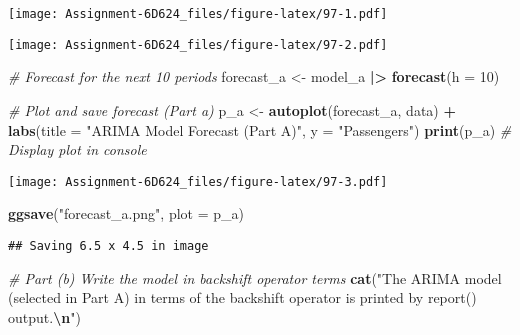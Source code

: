 \documentclass[
]{article}
\newenvironment{Shaded}{\begin{snugshade}}{\end{snugshade}}
\newcommand{\AttributeTok}[1]{\textcolor[rgb]{0.13,0.29,0.53}{#1}}
\newcommand{\CommentTok}[1]{\textcolor[rgb]{0.56,0.35,0.01}{\textit{#1}}}
\newcommand{\DecValTok}[1]{\textcolor[rgb]{0.00,0.00,0.81}{#1}}
\newcommand{\FunctionTok}[1]{\textcolor[rgb]{0.13,0.29,0.53}{\textbf{#1}}}
\newcommand{\NormalTok}[1]{#1}
\newcommand{\OtherTok}[1]{\textcolor[rgb]{0.56,0.35,0.01}{#1}}
\newcommand{\SpecialCharTok}[1]{\textcolor[rgb]{0.81,0.36,0.00}{\textbf{#1}}}
\newcommand{\StringTok}[1]{\textcolor[rgb]{0.31,0.60,0.02}{#1}}
\begin{document}
\texttt{[image: Assignment-6D624\_files/figure-latex/97-1.pdf]}

\begin{Shaded}
\end{Shaded}

\texttt{[image: Assignment-6D624\_files/figure-latex/97-2.pdf]}

\begin{Shaded}
\begin{Highlighting}[]
\CommentTok{\# Forecast for the next 10 periods}
\NormalTok{forecast\_a }\OtherTok{\textless{}{-}}\NormalTok{ model\_a }\SpecialCharTok{|\textgreater{}} \FunctionTok{forecast}\NormalTok{(}\AttributeTok{h =} \DecValTok{10}\NormalTok{)}

\CommentTok{\# Plot and save forecast (Part a)}
\NormalTok{p\_a }\OtherTok{\textless{}{-}} \FunctionTok{autoplot}\NormalTok{(forecast\_a, data) }\SpecialCharTok{+}
  \FunctionTok{labs}\NormalTok{(}\AttributeTok{title =} \StringTok{"ARIMA Model Forecast (Part A)"}\NormalTok{, }\AttributeTok{y =} \StringTok{"Passengers"}\NormalTok{)}
\FunctionTok{print}\NormalTok{(p\_a) }\CommentTok{\# Display plot in console}
\end{Highlighting}
\end{Shaded}

\texttt{[image: Assignment-6D624\_files/figure-latex/97-3.pdf]}

\begin{Shaded}
\begin{Highlighting}[]
\FunctionTok{ggsave}\NormalTok{(}\StringTok{"forecast\_a.png"}\NormalTok{, }\AttributeTok{plot =}\NormalTok{ p\_a)}
\end{Highlighting}
\end{Shaded}

\begin{verbatim}
## Saving 6.5 x 4.5 in image
\end{verbatim}

\begin{Shaded}
\begin{Highlighting}[]
\CommentTok{\# Part (b) Write the model in backshift operator terms}
\FunctionTok{cat}\NormalTok{(}\StringTok{"The ARIMA model (selected in Part A) in terms of the backshift operator is printed by \textquotesingle{}report()\textquotesingle{} output.}\SpecialCharTok{\textbackslash{}n}\StringTok{"}\NormalTok{)}
\end{Highlighting}
\end{Shaded}
\end{document}

